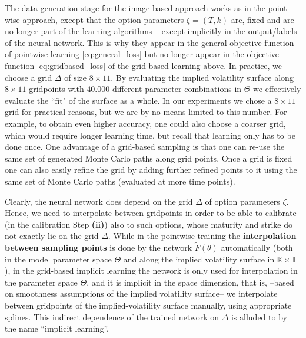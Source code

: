 \documentclass{article}
\theoremstyle{remark}
\begin{document}
The data generation stage for the image-based approach works as in the
point-wise approach, except that the option parameters $\zeta = (T,k)$ are, fixed and are no longer part of the learning algorithms -- except
implicitly in the output/labels of the neural network. This is why they appear in the general objective function of pointwise learning \eqref{eq:general_loss} but no longer appear in the objective function \eqref{eq:gridbased_loss} of the grid-based learning  above.
In practice, we choose a grid $\Delta$ of size $8\times 11$. By evaluating the implied volatility surface along $8\times 11$ gridpoints with $40.000$ different parameter combinations in $\Theta$ we effectively evaluate the ``fit" of the surface as a whole. In our experiments we chose a $8\times 11$ grid for practical reasons, but we are by no means limited to this number. For example, to obtain even higher accuracy, one could also choose a coarser grid, which would require longer learning time, but recall that learning only has to be done once. One advantage of a grid-based sampling is that one can re-use the same set of generated Monte Carlo paths along grid points. Once a grid is fixed one can also easily refine the grid by adding further refined points to it using the same set of Monte Carlo paths (evaluated at more time points).

Clearly, the neural network does depend on the grid $\Delta$ of option
parameters $\zeta$. Hence, we need to interpolate between gridpoints in order to be able to calibrate (in the calibration Step \textbf{(ii)}) also to such options, whose
maturity and strike do not exactly lie on the grid $\Delta$. 
While in the pointwise training the \textbf{interpolation between sampling points} is done by the network $\widetilde{F}(\theta)$ automatically (both in the model parameter space $\Theta$ and along the implied volatility surface in $\mathbb{K}\times \mathbb{T}$), in the grid-based implicit learning the network is only used for interpolation in the parameter space $\Theta$, and it is implicit in the space dimension, that is, --based on smoothness assumptions of the implied volatility surface-- we
interpolate between gridpoints of the implied-volatility surface manually, using appropriate splines. This indirect dependence of the trained network on $\Delta$ is alluded to by the name ``implicit learning''.
\vspace*{0.2cm}
\end{document}
